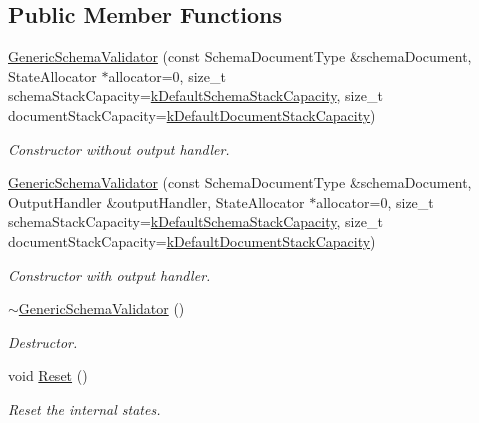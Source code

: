\subsection*{Public Member Functions}
\begin{DoxyCompactItemize}
\item 
\mbox{\hyperlink{classrapidjson_1_1_generic_schema_validator_acc07bd08b00195d84bb5b83f59c593d3}{Generic\+Schema\+Validator}} (const Schema\+Document\+Type \&schema\+Document, State\+Allocator $\ast$allocator=0, size\+\_\+t schema\+Stack\+Capacity=\mbox{\hyperlink{classrapidjson_1_1_generic_schema_validator_ad11f6f1456ca3196a6ea4af85f0e7dca}{k\+Default\+Schema\+Stack\+Capacity}}, size\+\_\+t document\+Stack\+Capacity=\mbox{\hyperlink{classrapidjson_1_1_generic_schema_validator_aa80da69ff44fff7e6e62d2444359d4e6}{k\+Default\+Document\+Stack\+Capacity}})
\begin{DoxyCompactList}\small\item\em Constructor without output handler. \end{DoxyCompactList}\item 
\mbox{\hyperlink{classrapidjson_1_1_generic_schema_validator_a0e1d8f19381bd53d77cc00a9a6dcd067}{Generic\+Schema\+Validator}} (const Schema\+Document\+Type \&schema\+Document, Output\+Handler \&output\+Handler, State\+Allocator $\ast$allocator=0, size\+\_\+t schema\+Stack\+Capacity=\mbox{\hyperlink{classrapidjson_1_1_generic_schema_validator_ad11f6f1456ca3196a6ea4af85f0e7dca}{k\+Default\+Schema\+Stack\+Capacity}}, size\+\_\+t document\+Stack\+Capacity=\mbox{\hyperlink{classrapidjson_1_1_generic_schema_validator_aa80da69ff44fff7e6e62d2444359d4e6}{k\+Default\+Document\+Stack\+Capacity}})
\begin{DoxyCompactList}\small\item\em Constructor with output handler. \end{DoxyCompactList}\item 
\mbox{\hyperlink{classrapidjson_1_1_generic_schema_validator_ad9f00d71bf62b8983cf2514c43fb1572}{$\sim$\+Generic\+Schema\+Validator}} ()
\begin{DoxyCompactList}\small\item\em Destructor. \end{DoxyCompactList}\item 
void \mbox{\hyperlink{classrapidjson_1_1_generic_schema_validator_afe6cd0d9088a1d4cf8100c0efc9f76fc}{Reset}} ()
\begin{DoxyCompactList}\small\item\em Reset the internal states. \end{DoxyCompactList}\item 

\end{DoxyCompactItemize}
